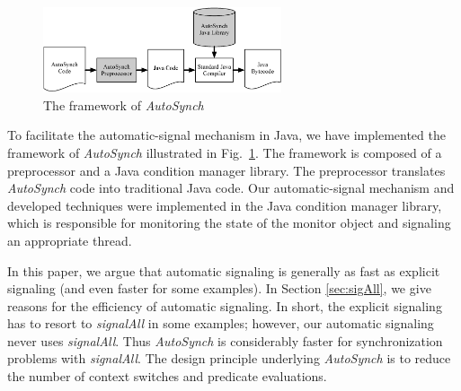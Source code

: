 \documentclass{sigplanconf}
\begin{document}
\begin{figure}[ht!]
  \centering
  \includegraphics[width=70mm]{fig/flow.eps}
  \caption{The framework of {\em  AutoSynch}}
  \label{fig:fw}
\end{figure}


To facilitate the automatic-signal mechanism in Java, we have implemented the 
framework of {\em AutoSynch} illustrated in Fig.~\ref{fig:fw}. 
The framework is composed of a 
preprocessor and a Java condition manager library. The preprocessor translates 
{\em AutoSynch} code into traditional Java code. 
Our automatic-signal mechanism and 
developed techniques were implemented in the Java condition manager library, 
which is responsible for monitoring the state of the monitor object
and signaling an appropriate thread.


%


In this paper, we argue that automatic signaling is generally as fast as explicit 
signaling (and even faster for some examples). In Section \ref{sec:sigAll}, we give reasons
for the efficiency of automatic signaling. In short, the explicit signaling has 
to resort to {\em signalAll} in some examples; however, our automatic signaling never 
uses {\em signalAll}. Thus {\em AutoSynch} is 
considerably faster for synchronization problems with 
{\em signalAll}. The design principle underlying {\em AutoSynch} is to reduce 
the number of context switches and predicate evaluations.
\end{document}
